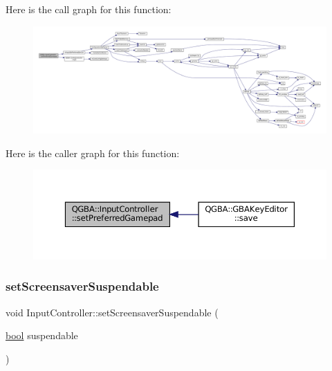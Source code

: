 Here is the call graph for this function\+:
\nopagebreak
\begin{figure}[H]
\begin{center}
\leavevmode
\includegraphics[width=350pt]{class_q_g_b_a_1_1_input_controller_af97b15453bd2259d7faa448995ae1c1a_cgraph}
\end{center}
\end{figure}
Here is the caller graph for this function\+:
\nopagebreak
\begin{figure}[H]
\begin{center}
\leavevmode
\includegraphics[width=350pt]{class_q_g_b_a_1_1_input_controller_af97b15453bd2259d7faa448995ae1c1a_icgraph}
\end{center}
\end{figure}
\mbox{\label{class_q_g_b_a_1_1_input_controller_aa09db1d4f2f488a78dfc27899d087094}} 
\subsubsection{\texorpdfstring{set\+Screensaver\+Suspendable}{setScreensaverSuspendable}}
{\footnotesize\ttfamily void Input\+Controller\+::set\+Screensaver\+Suspendable (\begin{DoxyParamCaption}\item[{\mbox{\hyperlink{libretro_8h_a4a26dcae73fb7e1528214a068aca317e}{bool}}}]{suspendable }\end{DoxyParamCaption})\hspace{0.3cm}{\ttfamily [slot]}}

